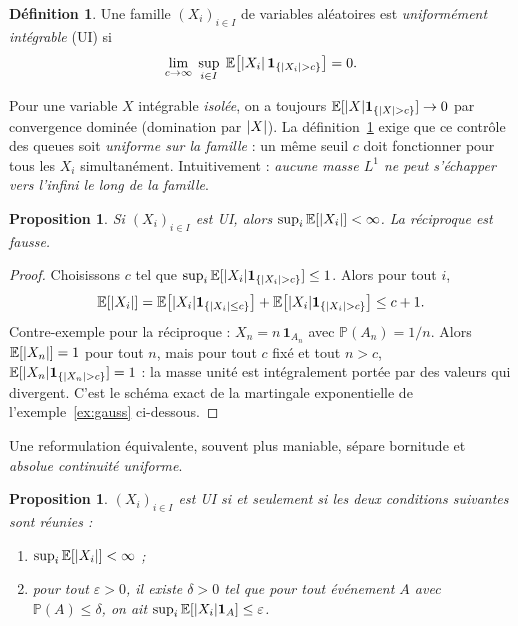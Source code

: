 \documentclass[11pt,a4paper]{article}
\theoremstyle{plain}
\newtheorem{proposition}[theorem]{Proposition}
\theoremstyle{definition}
\newtheorem{definition}[theorem]{Définition}
\theoremstyle{remark}
\newcommand{\E}{\mathbb{E}}
\newcommand{\Prob}{\mathbb{P}}
\newcommand{\ind}{\mathbf{1}}
\DeclarePairedDelimiter{\abs}{\lvert}{\rvert}
\begin{document}
\begin{definition}\label{def:UI}
Une famille $(X_i)_{i \in I}$ de variables aléatoires est \emph{uniformément
intégrable} (UI) si
\[
\lim_{c \to \infty} \; \sup_{i \in I} \;
\E\bigl[\abs{X_i}\, \ind_{\{\abs{X_i} > c\}}\bigr] = 0.
\]
\end{definition}

Pour une variable $X$ intégrable \emph{isolée}, on a toujours
$\E[\abs{X}\ind_{\{\abs{X}>c\}}] \to 0$ par convergence dominée
(domination par $\abs{X}$). La définition~\ref{def:UI} exige que ce contrôle des
queues soit \emph{uniforme sur la famille} : un même seuil $c$ doit fonctionner
pour tous les $X_i$ simultanément. Intuitivement : \emph{aucune masse $L^1$ ne
peut s'échapper vers l'infini le long de la famille}.

\begin{proposition}\label{prop:UI-L1}
Si $(X_i)_{i\in I}$ est UI, alors $\sup_i \E[\abs{X_i}] < \infty$. La réciproque
est fausse.
\end{proposition}

\begin{proof}
Choisissons $c$ tel que $\sup_i \E[\abs{X_i}\ind_{\{\abs{X_i}>c\}}] \le 1$.
Alors pour tout $i$,
\[
\E[\abs{X_i}] = \E\bigl[\abs{X_i}\ind_{\{\abs{X_i}\le c\}}\bigr]
+ \E\bigl[\abs{X_i}\ind_{\{\abs{X_i}>c\}}\bigr] \le c + 1.
\]
Contre-exemple pour la réciproque : $X_n = n\,\ind_{A_n}$ avec
$\Prob(A_n) = 1/n$. Alors $\E[\abs{X_n}] = 1$ pour tout $n$, mais pour tout $c$
fixé et tout $n > c$, $\E[\abs{X_n}\ind_{\{\abs{X_n}>c\}}] = 1$ : la masse
unité est intégralement portée par des valeurs qui divergent. C'est le schéma
exact de la martingale exponentielle de l'exemple~\ref{ex:gauss} ci-dessous.
\end{proof}

Une reformulation équivalente, souvent plus maniable, sépare bornitude et
\emph{absolue continuité uniforme}.

\begin{proposition}\label{prop:UI-eps-delta}
$(X_i)_{i\in I}$ est UI si et seulement si les deux conditions suivantes sont
réunies :
\begin{enumerate}[label=(\alph*)]
\item $\sup_i \E[\abs{X_i}] < \infty$ ;
\item pour tout $\varepsilon > 0$, il existe $\delta > 0$ tel que pour tout
      événement $A$ avec $\Prob(A) \le \delta$, on ait
      $\sup_i \E[\abs{X_i}\ind_A] \le \varepsilon$.
\end{enumerate}
\end{proposition}
\end{document}
